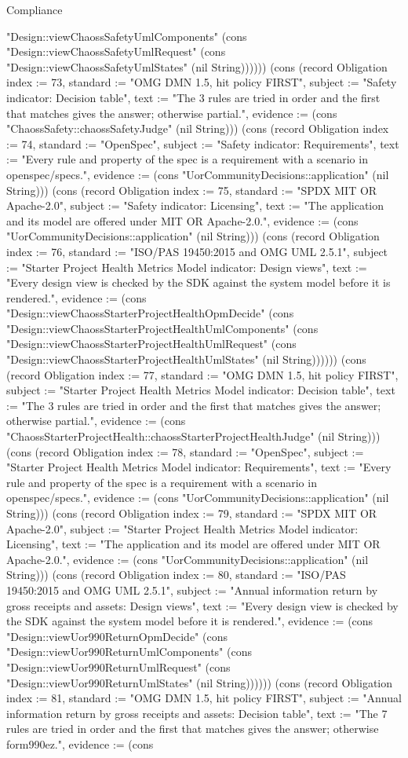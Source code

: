 \begin{lexlean}{Compliance}
\begin{semanticmodule}
{"Design::viewChaossSafetyUmlComponents" (cons "Design::viewChaossSafetyUmlRequest" (cons "Design::viewChaossSafetyUmlStates" (nil String)))))}) (cons (record Obligation {index := 73, standard := "OMG DMN 1.5, hit policy FIRST", subject := "Safety indicator: Decision table", text := "The 3 rules are tried in order and the first that matches gives the answer; otherwise partial.", evidence := (cons "ChaossSafety::chaossSafetyJudge" (nil String))}) (cons (record Obligation {index := 74, standard := "OpenSpec", subject := "Safety indicator: Requirements", text := "Every rule and property of the spec is a requirement with a scenario in openspec/specs.", evidence := (cons "UorCommunityDecisions::application" (nil String))}) (cons (record Obligation {index := 75, standard := "SPDX MIT OR Apache-2.0", subject := "Safety indicator: Licensing", text := "The application and its model are offered under MIT OR Apache-2.0.", evidence := (cons "UorCommunityDecisions::application" (nil String))}) (cons (record Obligation {index := 76, standard := "ISO/PAS 19450:2015 and OMG UML 2.5.1", subject := "Starter Project Health Metrics Model indicator: Design views", text := "Every design view is checked by the SDK against the system model before it is rendered.", evidence := (cons "Design::viewChaossStarterProjectHealthOpmDecide" (cons "Design::viewChaossStarterProjectHealthUmlComponents" (cons "Design::viewChaossStarterProjectHealthUmlRequest" (cons "Design::viewChaossStarterProjectHealthUmlStates" (nil String)))))}) (cons (record Obligation {index := 77, standard := "OMG DMN 1.5, hit policy FIRST", subject := "Starter Project Health Metrics Model indicator: Decision table", text := "The 3 rules are tried in order and the first that matches gives the answer; otherwise partial.", evidence := (cons "ChaossStarterProjectHealth::chaossStarterProjectHealthJudge" (nil String))}) (cons (record Obligation {index := 78, standard := "OpenSpec", subject := "Starter Project Health Metrics Model indicator: Requirements", text := "Every rule and property of the spec is a requirement with a scenario in openspec/specs.", evidence := (cons "UorCommunityDecisions::application" (nil String))}) (cons (record Obligation {index := 79, standard := "SPDX MIT OR Apache-2.0", subject := "Starter Project Health Metrics Model indicator: Licensing", text := "The application and its model are offered under MIT OR Apache-2.0.", evidence := (cons "UorCommunityDecisions::application" (nil String))}) (cons (record Obligation {index := 80, standard := "ISO/PAS 19450:2015 and OMG UML 2.5.1", subject := "Annual information return by gross receipts and assets: Design views", text := "Every design view is checked by the SDK against the system model before it is rendered.", evidence := (cons "Design::viewUor990ReturnOpmDecide" (cons "Design::viewUor990ReturnUmlComponents" (cons "Design::viewUor990ReturnUmlRequest" (cons "Design::viewUor990ReturnUmlStates" (nil String)))))}) (cons (record Obligation {index := 81, standard := "OMG DMN 1.5, hit policy FIRST", subject := "Annual information return by gross receipts and assets: Decision table", text := "The 7 rules are tried in order and the first that matches gives the answer; otherwise form990ez.", evidence := (cons }
\end{semanticmodule}
\end{lexlean}
